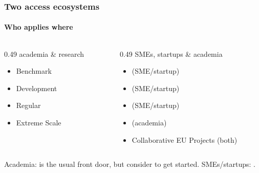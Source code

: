 \documentclass[10pt,aspectratio=169,notheorems]{beamer}
\begin{document}
\begin{frame}
    \frametitle{Two access ecosystems}
    \framesubtitle{Who applies where}
    \begin{columns}[t]
        \begin{column}{0.49\textwidth}
        \textcolor{SlidemintMuted}{\scriptsize academia \& research}
        \begin{itemize}
            \item Benchmark
            \item Development
            \item Regular
            \item Extreme Scale
        \end{itemize}
        \end{column}

        \begin{column}{0.49\textwidth}
        \textcolor{SlidemintMuted}{\scriptsize SMEs, startups \& academia}
        \begin{itemize}
            \item {} \textcolor{SlidemintMuted}{\scriptsize (SME/startup)}
            \item {} \textcolor{SlidemintMuted}{\scriptsize (SME/startup)}
            \item {} \textcolor{SlidemintMuted}{\scriptsize (SME/startup)}
            \item {} \textcolor{SlidemintMuted}{\scriptsize (academia)}
            \item Collaborative EU Projects \textcolor{SlidemintMuted}{\scriptsize (both)}
        \end{itemize}
        \end{column}
    \end{columns}

    \vspace{1.5em}
    \textcolor{SlidemintMuted}{Academia:  is the usual front door, but consider  to get started. SMEs/startups: .}
\end{frame}
\end{document}
